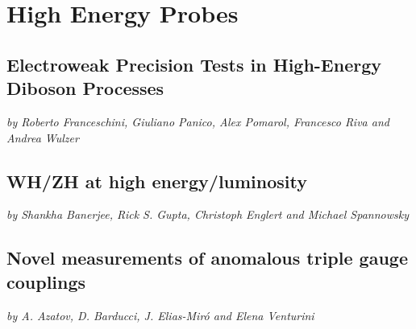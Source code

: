 \documentclass[../report.tex]{subfiles}
\providecommand{\main}{..}
\begin{document}
\section{High Energy Probes}
\label{sec4}






\subsection{Electroweak Precision Tests  in High-Energy Diboson Processes} \label{WZlong}
\begin{center}
{\it by Roberto Franceschini,  Giuliano Panico,  Alex Pomarol,
  Francesco Riva  and Andrea Wulzer}
\end{center}






\subsection{WH/ZH at high energy/luminosity}\label{sec:ZHWZeft}
\begin{center}
{\it by Shankha Banerjee,  Rick S. Gupta,  Christoph Englert and Michael Spannowsky}
\end{center}





\subsection{Novel measurements of anomalous triple gauge couplings} \label{sec:WZtrans}
\begin{center}
{\it by A. Azatov, D. Barducci, J. Elias-Mir\'o and Elena Venturini}
\end{center}

\end{document}
